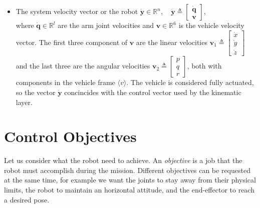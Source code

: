 \begin{itemize}
	\item The system velocity vector or the robot $\dot{\boldsymbol{y}} \in \mathbb{R}^n$, ~
	$\dot{\boldsymbol{y}} \triangleq 
	\begin{bmatrix}\dot{\boldsymbol{q}} \\ \boldsymbol{v}\end{bmatrix}$,\\
	where $\dot{\boldsymbol{q}} \in \mathbb{R}^{l}$ are the arm joint velocities and $\boldsymbol{v} \in \mathbb{R}^{6}$ is the vehicle velocity vector. The first three component of $\boldsymbol{v}$ are the linear velocities $\boldsymbol{v}_1 \triangleq \begin{bmatrix}\dot{x} \\ \dot{y} \\ \dot{z}\end{bmatrix}$ and the last three are the angular velocities $\boldsymbol{v}_2 \triangleq \begin{bmatrix}p \\ q \\ r\end{bmatrix}$, both with components in the vehicle frame $\langle v \rangle$. The vehicle is considered fully actuated, so the vector $\dot{\boldsymbol{y}}$ concincides with the control vector used by the kinematic layer.
\end{itemize}
	
\section{Control Objectives}
\label{sec:controlObjectives}
Let us consider what the robot need to achieve. An \textit{objective} is a job that the robot must accomplish during the mission. Different objectives can be requested at the same time, for example we want the joints to stay away from their physical limits, the robot to maintain an horizontal attitude, and the end-effector to reach a desired pose.
